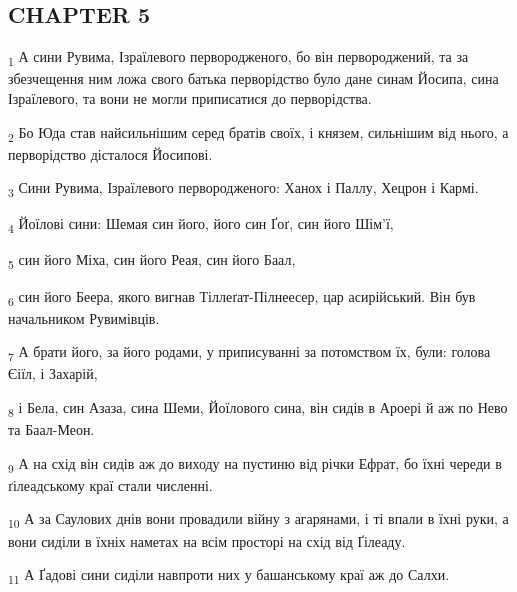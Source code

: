 \subsection{CHAPTER 5}
\begin{tcolorbox}
\textsubscript{1} А сини Рувима, Ізраїлевого первородженого, бо він первороджений, та за збезчещення ним ложа свого батька перворідство було дане синам Йосипа, сина Ізраїлевого, та вони не могли приписатися до перворідства.
\end{tcolorbox}
\begin{tcolorbox}
\textsubscript{2} Бо Юда став найсильнішим серед братів своїх, і князем, сильнішим від нього, а перворідство дісталося Йосипові.
\end{tcolorbox}
\begin{tcolorbox}
\textsubscript{3} Сини Рувима, Ізраїлевого первородженого: Ханох і Паллу, Хецрон і Кармі.
\end{tcolorbox}
\begin{tcolorbox}
\textsubscript{4} Йоїлові сини: Шемая син його, його син Ґоґ, син його Шім'ї,
\end{tcolorbox}
\begin{tcolorbox}
\textsubscript{5} син його Міха, син його Реая, син його Баал,
\end{tcolorbox}
\begin{tcolorbox}
\textsubscript{6} син його Беера, якого вигнав Тіллеґат-Пілнеесер, цар асирійський. Він був начальником Рувимівців.
\end{tcolorbox}
\begin{tcolorbox}
\textsubscript{7} А брати його, за його родами, у приписуванні за потомством їх, були: голова Єіїл, і Захарій,
\end{tcolorbox}
\begin{tcolorbox}
\textsubscript{8} і Бела, син Азаза, сина Шеми, Йоїлового сина, він сидів в Ароері й аж по Нево та Баал-Меон.
\end{tcolorbox}
\begin{tcolorbox}
\textsubscript{9} А на схід він сидів аж до виходу на пустиню від річки Ефрат, бо їхні череди в ґілеадському краї стали численні.
\end{tcolorbox}
\begin{tcolorbox}
\textsubscript{10} А за Саулових днів вони провадили війну з агарянами, і ті впали в їхні руки, а вони сиділи в їхніх наметах на всім просторі на схід від Ґілеаду.
\end{tcolorbox}
\begin{tcolorbox}
\textsubscript{11} А Ґадові сини сиділи навпроти них у башанському краї аж до Салхи.
\end{tcolorbox}
